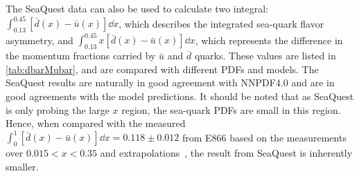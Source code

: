 \documentclass[reprint,aps,unsortedaddress,superscriptaddress,prl,floatfix,showpacs,linenumbers,final]{revtex4-2}
\begin{document}

The SeaQuest data can also be used to calculate two integral: $\int^{0.45}_{0.13} \left[\bar{d}\left(x\right) - \bar{u}\left(x\right) \right]\dd{x}$,
which describes the integrated sea-quark flavor asymmetry, and $\int^{0.45}_{0.13} x\left[\bar{d}\left(x\right) - \bar{u}\left(x\right) \right]\dd{x}$,
which represents the difference in the momentum fractions carried by $\bar{u}$ and $\bar{d}$ quarks.
These values are listed in \cref{tab:dbarMubar}, and are compared with different PDFs and models.
The SeaQuest results are naturally in good agreement with NNPDF4.0 and are in good agreements with the model predictions.
It should be noted that as SeaQuest is only probing the large $x$ region, the sea-quark PDFs are small in this region.
Hence, when compared with the measured $\int^{1}_{0} \left[\bar{d}\left(x\right) - \bar{u}\left(x\right) \right]\dd{x}=0.118\pm 0.012$
from E866 based on the measurements over $0.015<x<0.35$ and extrapolations~\cite{towell2001},
the result from SeaQuest is inherently smaller.
\end{document}
